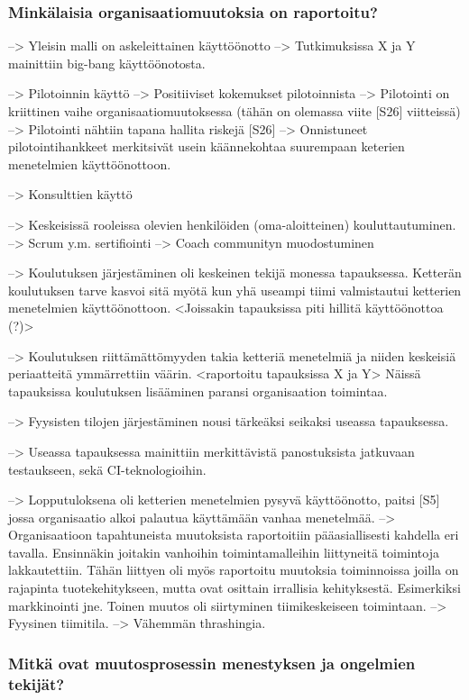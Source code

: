 \subsubsection{Minkälaisia organisaatiomuutoksia on raportoitu?}

--> Yleisin malli on askeleittainen käyttöönotto
--> Tutkimuksissa X ja Y mainittiin big-bang käyttöönotosta.

--> Pilotoinnin käyttö
--> Positiiviset kokemukset pilotoinnista
--> Pilotointi on kriittinen vaihe organisaatiomuutoksessa (tähän on olemassa
viite [S26] viitteissä)
--> Pilotointi nähtiin tapana hallita riskejä [S26]
--> Onnistuneet pilotointihankkeet merkitsivät usein käännekohtaa suurempaan
keterien menetelmien käyttöönottoon.

--> Konsulttien käyttö

--> Keskeisissä rooleissa olevien henkilöiden (oma-aloitteinen) kouluttautuminen.
--> Scrum y.m. sertifiointi
--> Coach communityn muodostuminen

--> Koulutuksen järjestäminen oli keskeinen tekijä monessa tapauksessa.
Ketterän koulutuksen tarve kasvoi sitä myötä kun yhä useampi tiimi valmistautui
ketterien menetelmien käyttöönottoon. <Joissakin tapauksissa piti hillitä
käyttöönottoa (?)>

--> Koulutuksen riittämättömyyden takia ketteriä menetelmiä ja niiden keskeisiä
periaatteitä ymmärrettiin väärin. <raportoitu tapauksissa X ja Y> Näissä
tapauksissa koulutuksen lisääminen paransi organisaation toimintaa.

--> Fyysisten tilojen järjestäminen nousi tärkeäksi seikaksi useassa tapauksessa.

--> Useassa tapauksessa mainittiin merkittävistä panostuksista jatkuvaan
testaukseen, sekä CI-teknologioihin.

--> Lopputuloksena oli ketterien menetelmien pysyvä käyttöönotto, paitsi [S5]
jossa organisaatio alkoi palautua käyttämään vanhaa menetelmää.
--> Organisaatioon tapahtuneista muutoksista raportoitiin pääasiallisesti
kahdella eri tavalla. Ensinnäkin joitakin vanhoihin toimintamalleihin
liittyneitä toimintoja lakkautettiin. Tähän liittyen oli myös raportoitu
muutoksia toiminnoissa joilla on rajapinta tuotekehitykseen, mutta ovat
osittain irrallisia kehityksestä. Esimerkiksi markkinointi jne. Toinen muutos
oli siirtyminen tiimikeskeiseen toimintaan.
--> Fyysinen tiimitila. --> Vähemmän thrashingia.

\subsubsection{Mitkä ovat muutosprosessin menestyksen ja ongelmien tekijät?}

